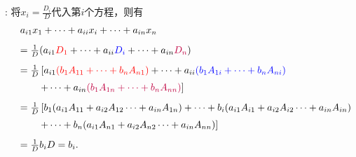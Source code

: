 \begin{frame}
  : 
  将$x_i=\frac{D_i}D$代入第$i$个方程，则有
  $$
  \begin{array}{cl}
    & a_{i1}x_1 +\cdots + a_{ii}x_i + \cdots + a_{in}x_n \\[0.3cm]
    & =   \frac1D(a_{i1}\textcolor{red}{D_1} +\cdots + a_{ii}\textcolor{blue}{D_i} + \cdots + a_{in}\textcolor{purple}{D_n}) \\[0.3cm]
    & =   \frac1D \left[
      a_{i1}\textcolor{red}{(b_1 A_{11}+ \cdots + b_nA_{n1})}
      +\cdots+ a_{ii}\textcolor{blue}{(b_1 A_{1i} + \cdots + b_nA_{ni})}  \right. \\[0.2cm]
    &  \left. \ \ \ \ \ \
      + \cdots + a_{in}\textcolor{purple}{(b_1 A_{1n}+ \cdots + b_nA_{nn})} \right]\\[0.3cm]
    & =   \frac1D \left[
      b_1(a_{i1} A_{11}+ a_{i2} A_{12}  \cdots + a_{in}A_{1n}) 
      +\cdots + b_i(a_{i1} A_{i1}+ a_{i2} A_{i2}  \cdots + a_{in}A_{in})   \right. \\[0.2cm]
    &  \left. \ \ \ \ \ \ + \cdots+ b_n(a_{i1} A_{n1}+ a_{i2} A_{n2}  \cdots + a_{in}A_{nn}) \right] \\[0.3cm]
    & =   \frac 1D b_{i} D = b_i.
  \end{array}
  $$
\end{frame}

